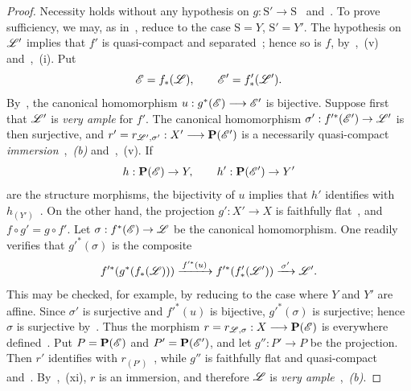 \begin{proof}
Necessity holds without any hypothesis on
$g:\mathrm{S}'\to\mathrm{S}$~
and~. To prove sufficiency, we may, as
in~, reduce to the case $\mathrm{S}=Y$,
$\mathrm{S}'=Y'$. The hypothesis on $\mathscr{L}'$ implies that $f'$ is
quasi-compact and separated~; hence so is $f$,
by~,~(v) and~,~(i). Put
\[
  \mathscr{E}=f_*(\mathscr{L}),\qquad
  \mathscr{E}'=f'_*(\mathscr{L}').
\]
By~, the canonical homomorphism $u:g^*(\mathscr{E})\longrightarrow\mathscr{E}'$
is bijective. Suppose first that $\mathscr{L}'$ is \emph{very ample} for $f'$. The
canonical homomorphism
$\sigma':f'^*(\mathscr{E}')\to\mathscr{L}'$ is then surjective, and $r'=r_{\mathscr{L}',\sigma'}:X'\longrightarrow\mathbf{P}(\mathscr{E}')$
is a necessarily quasi-compact \emph{immersion}~,~\emph{(b)}
and~,~(v). If
\[
  h:\mathbf{P}(\mathscr{E})\to Y,\qquad
  h':\mathbf{P}(\mathscr{E}')\to Y'
\]
are the structure morphisms, the bijectivity of $u$ implies that $h'$
identifies with $h_{(Y')}$~. On the other hand,
the projection $g':X'\to X$ is faithfully flat~, and
$f\circ g'=g\circ f'$. Let
$\sigma:f^*(\mathscr{E})\to\mathscr{L}$ be the canonical homomorphism. One
readily verifies that $g'^*(\sigma)$ is the composite
\[
  f'^*\!\left(g^*\!\left(f_*(\mathscr{L})\right)\right)
    \xrightarrow{\,f'^*(u)\,}
  f'^*\!\left(f'_*(\mathscr{L}')\right)
    \xrightarrow{\,\sigma'\,}
  \mathscr{L}' .
\]
This may be checked, for example, by reducing to the case where $Y$
and $Y'$ are affine. Since $\sigma'$ is surjective and $f'^*(u)$ is
bijective, $g'^*(\sigma)$ is surjective; hence $\sigma$ is surjective
by~. Thus the morphism $r=r_{\mathscr{L},\sigma}:X\longrightarrow\mathbf{P}(\mathscr{E})$
is everywhere defined~. Put
$P=\mathbf{P}(\mathscr{E})$ and $P'=\mathbf{P}(\mathscr{E}')$, and let
$g'':P'\to P$ be the projection. Then $r'$ identifies with
$r_{(P')}$~, while $g''$ is faithfully flat and
quasi-compact~ and~.
By~,~(xi), $r$ is an immersion, and therefore
$\mathscr{L}$ is \emph{very ample}~,~\emph{(b)}.


\end{proof}
